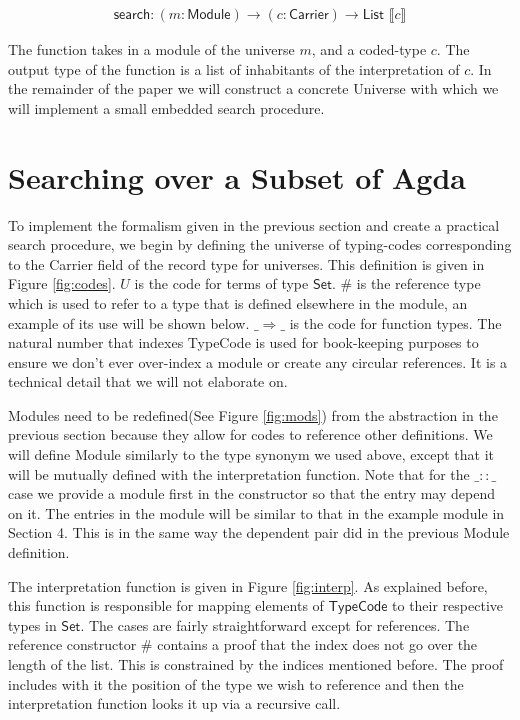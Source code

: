 \documentclass[acmsmall,review,authorversion]{acmart}
\newcommand{\term}[1]{\textsf{#1}}
\newcommand{\type}[1]{\textsf{#1}}
\newcommand{\Carrier}{\term{Carrier}}
\newcommand{\Set}{\type{Set}}
\newcommand{\Interp}[1]{\llbracket #1 \rrbracket}
\newcommand{\?}{\stackrel{?}{\approx}}
\newcommand{\search}{\term{search}}
\begin{document}
$$
\begin{array}{l}
  \search : (m : \textsf{Module})\rightarrow (c : \Carrier) \rightarrow \textsf{List }\Interp{c}
\end{array}
$$

The function takes in a module of the universe $m$, and a coded-type $c$. The
output type of the function is a list of inhabitants of the interpretation of
$c$. In the remainder of the paper we will construct a concrete Universe with
which we will implement a small embedded search procedure.

\section{Searching over a Subset of Agda} 

To implement the formalism given in the previous section and create a practical
search procedure, we begin by defining the universe of typing-codes
corresponding to the \textsf{Carrier} field of the record type for universes.
This definition is given in Figure \ref{fig:codes}. $U$ is the code for terms of
type $\Set$. $\#$ is the reference type which is used to refer to a type that is
defined elsewhere in the module, an example of its use will be shown below.
$\_\Rightarrow\_$ is the code for function types. The natural number that
indexes \textsf{TypeCode} is used for book-keeping purposes to ensure we don't
ever over-index a module or create any circular references. It is a technical
detail that we will not elaborate on.

Modules need to be redefined(See Figure \ref{fig:mods}) from the abstraction in
the previous section because they allow for codes to reference other
definitions. We will define Module similarly to the type synonym we used above,
except that it will be mutually defined with the interpretation function. Note
that for the $\_::\_$ case we provide a module first in the constructor so that
the entry may depend on it. The entries in the module will be similar to that in
the example module in Section 4. This is in the same way the dependent pair
did in the previous Module definition.

The interpretation function is given in Figure \ref{fig:interp}. As explained
before, this function is responsible for mapping elements of $\textsf{TypeCode}$
to their respective types in $\Set$. The cases are fairly straightforward except
for references. The reference constructor $\#$ contains a proof that the index
does not go over the length of the list. This is constrained by the indices
mentioned before. The proof includes with it the position of the type we wish to
reference and then the interpretation function looks it up via a recursive call. 
\end{document}
